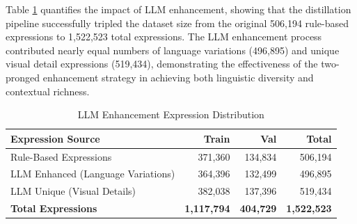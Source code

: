 Table \ref{tab:llm_enhancement_stats} quantifies the impact of LLM enhancement, showing that the distillation pipeline successfully tripled the dataset size from the original 506,194 rule-based expressions to 1,522,523 total expressions. The LLM enhancement process contributed nearly equal numbers of language variations (496,895) and unique visual detail expressions (519,434), demonstrating the effectiveness of the two-pronged enhancement strategy in achieving both linguistic diversity and contextual richness.

\begin{table}[H]
\centering
\caption{LLM Enhancement Expression Distribution}
\label{tab:llm_enhancement_stats}
\begin{tabular}{@{}lrrr@{}}
\toprule
\textbf{Expression Source} & \textbf{Train} & \textbf{Val} & \textbf{Total} \\
\midrule
Rule-Based Expressions & 371,360 & 134,834 & 506,194 \\
LLM Enhanced (Language Variations) & 364,396 & 132,499 & 496,895 \\
LLM Unique (Visual Details) & 382,038 & 137,396 & 519,434 \\
\midrule
\textbf{Total Expressions} & \textbf{1,117,794} & \textbf{404,729} & \textbf{1,522,523} \\
\bottomrule
\end{tabular}
\end{table}
